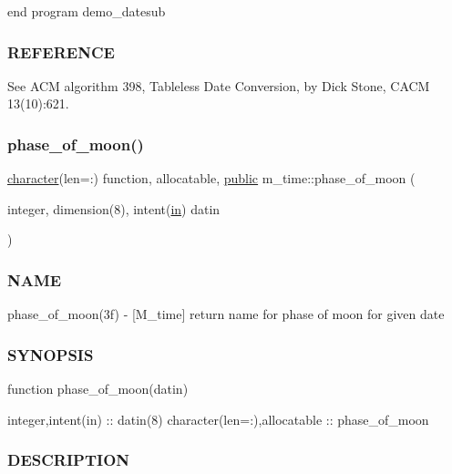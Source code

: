 \begin{DoxyVerb}
end program demo\+\_\+datesub

\subsubsection*{R\+E\+F\+E\+R\+E\+N\+CE}

See A\+CM algorithm 398, Tableless Date Conversion, by Dick Stone, C\+A\+CM 13(10)\+:621. \mbox{\label{namespacem__time_ab8a976e2f113cc38b6df80974cee55dc}} 
\subsubsection{\texorpdfstring{phase\+\_\+of\+\_\+moon()}{phase\_of\_moon()}}
{\footnotesize\ttfamily \hyperlink{option__stopwatch_83_8txt_abd4b21fbbd175834027b5224bfe97e66}{character}(len=\+:) function, allocatable, \hyperlink{M__stopwatch_83_8txt_a2f74811300c361e53b430611a7d1769f}{public} m\+\_\+time\+::phase\+\_\+of\+\_\+moon (\begin{DoxyParamCaption}\item[{integer, dimension(8), intent(\hyperlink{M__journal_83_8txt_afce72651d1eed785a2132bee863b2f38}{in})}]{datin }\end{DoxyParamCaption})}



\subsubsection*{N\+A\+ME}

phase\+\_\+of\+\_\+moon(3f) -\/ \mbox{[}M\+\_\+time\mbox{]} return name for phase of moon for given date \subsubsection*{S\+Y\+N\+O\+P\+S\+IS}

function phase\+\_\+of\+\_\+moon(datin)

integer,intent(in) \+:\+: datin(8) character(len=\+:),allocatable \+:\+: phase\+\_\+of\+\_\+moon

\subsubsection*{D\+E\+S\+C\+R\+I\+P\+T\+I\+ON}


\end{DoxyVerb}
